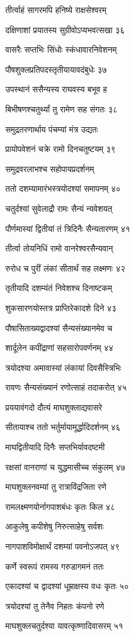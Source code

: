 तीर्त्वाहं सागरमपि हनिष्ये राक्षसेश्वरम्

दक्षिणाशां प्रयातस्य सुग्रीवोऽप्यभवत्सखा ३६

वासरैः सप्तभिः सिंधोः स्कंधावारनिवेशनम्

पौषशुक्लप्रतिपदस्तृतीयायावदंबुधेः ३७

उपस्थानं ससैन्यस्य राघवस्य बभूव ह

बिभीषणश्चतुर्थ्यां तु रामेण सह संगतः ३८

समुद्रतरणार्थाय पंचम्यां मंत्र उद्यतः

प्रायोपवेशनं चक्रे रामो दिनचतुष्टयम् ३९

समुद्रवरलाभश्च सहोपायप्रदर्शनम्

ततो दशम्यामारंभस्त्रयोदश्यां समापनम् ४०

चतुर्दश्यां सुवेलाद्रौ रामः सैन्यं न्यवेशयत्

पौर्णमास्यां द्वितीयां तं त्रिदिनैः सैन्यतारणम् ४१

तीर्त्वा तोयनिधिं रामो वानरेश्वरसैन्यवान्

रुरोध च पुरीं लंकां सीतार्थं सह लक्ष्मणः ४२

तृतीयादि दशम्यंतं निवेशश्च दिनाष्टकम्

शुकसारणयोस्तत्र प्राप्तिरेकादशे दिने ४३

पौषासिताख्यद्वादश्यां सैन्यसंख्यानमेव च

शार्दूलेन कपींद्राणां सहसारोपवर्णनम् ४४

त्रयोदश्या अमावास्यां लंकायां दिवसैस्त्रिभिः

रावणः सैन्यसंख्यानं रणोत्साहं तदाकरोत् ४५

प्रययावंगदो दौत्यं माघशुक्लाद्यवासरे

सीतायाश्च ततो भर्तुर्मायामूर्द्धादिदर्शनम् ४६

माघद्वितीयादि दिनैः सप्तभिर्यावदष्टमी

रक्षसां वानराणां च युद्धमासीच्च संकुलम् ४७

माघशुक्लनवम्यां तु रात्राविंद्रजिता रणे

रामलक्ष्मणयोर्नागपाशबंधः कृतः किल ४८

आकुलेषु कपीशेषु निरुत्साहेषु सर्वशः

नागपाशविमोक्षार्थं दशम्यां पवनोऽजपत् ४९

कर्णे स्वरूपं रामस्य गरुडागमनं ततः

एकादश्यां च द्वादश्यां धूम्राक्षस्य वधः कृतः ५०

त्रयोदश्यां तु तेनैव निहतः कंपनो रणे

माघशुक्लचतुर्दश्या यावत्कृष्णादिवासरम् ५१


